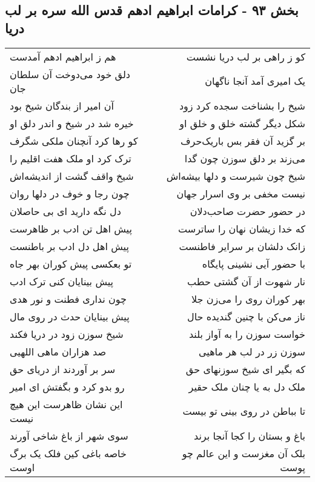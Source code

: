 \begin{center}
\section*{بخش ۹۳ - کرامات ابراهیم ادهم قدس الله سره بر لب دریا}
\label{sec:sh093}
\begin{longtable}{l p{0.5cm} r}
هم ز ابراهیم ادهم آمدست
&&
کو ز راهی بر لب دریا نشست
\\
دلق خود می‌دوخت آن سلطان جان
&&
یک امیری آمد آنجا ناگهان
\\
آن امیر از بندگان شیخ بود
&&
شیخ را بشناخت سجده کرد زود
\\
خیره شد در شیخ و اندر دلق او
&&
شکل دیگر گشته خلق و خلق او
\\
کو رها کرد آنچنان ملکی شگرف
&&
بر گزید آن فقر بس باریک‌حرف
\\
ترک کرد او ملک هفت اقلیم را
&&
می‌زند بر دلق سوزن چون گدا
\\
شیخ واقف گشت از اندیشه‌اش
&&
شیخ چون شیرست و دلها بیشه‌اش
\\
چون رجا و خوف در دلها روان
&&
نیست مخفی بر وی اسرار جهان
\\
دل نگه دارید ای بی حاصلان
&&
در حضور حضرت صاحب‌دلان
\\
پیش اهل تن ادب بر ظاهرست
&&
که خدا زیشان نهان را ساترست
\\
پیش اهل دل ادب بر باطنست
&&
زانک دلشان بر سرایر فاطنست
\\
تو بعکسی پیش کوران بهر جاه
&&
با حضور آیی نشینی پایگاه
\\
پیش بینایان کنی ترک ادب
&&
نار شهوت از آن گشتی حطب
\\
چون نداری فطنت و نور هدی
&&
بهر کوران روی را می‌زن جلا
\\
پیش بینایان حدث در روی مال
&&
ناز می‌کن با چنین گندیده حال
\\
شیخ سوزن زود در دریا فکند
&&
خواست سوزن را به آواز بلند
\\
صد هزاران ماهی اللهیی
&&
سوزن زر در لب هر ماهیی
\\
سر بر آوردند از دریای حق
&&
که بگیر ای شیخ سوزنهای حق
\\
رو بدو کرد و بگفتش ای امیر
&&
ملک دل به یا چنان ملک حقیر
\\
این نشان ظاهرست این هیچ نیست
&&
تا بباطن در روی بینی تو بیست
\\
سوی شهر از باغ شاخی آورند
&&
باغ و بستان را کجا آنجا برند
\\
خاصه باغی کین فلک یک برگ اوست
&&
بلک آن مغزست و این عالم چو پوست
\\

\end{longtable}
\end{center}
